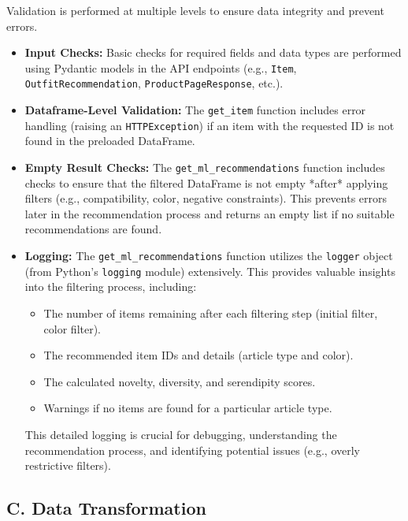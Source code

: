 \documentclass[12pt,a4paper]{article}
\begin{document}
Validation is performed at multiple levels to ensure data integrity and prevent errors.

\begin{itemize}[leftmargin=*, itemsep=0.3em]
    \item \textbf{Input Checks:}  Basic checks for required fields and data types are performed using Pydantic models in the API endpoints (e.g., \texttt{Item}, \texttt{OutfitRecommendation}, \texttt{ProductPageResponse}, etc.).

    \item \textbf{Dataframe-Level Validation:} The \texttt{get\_item} function includes error handling (raising an \texttt{HTTPException}) if an item with the requested ID is not found in the preloaded DataFrame.

    \item \textbf{Empty Result Checks:} The \texttt{get\_ml\_recommendations} function includes checks to ensure that the filtered DataFrame is not empty *after* applying filters (e.g., compatibility, color, negative constraints).  This prevents errors later in the recommendation process and returns an empty list if no suitable recommendations are found.

    \item \textbf{Logging:}  The \texttt{get\_ml\_recommendations} function utilizes the \texttt{logger} object (from Python's \texttt{logging} module) extensively.  This provides valuable insights into the filtering process, including:
      \begin{itemize}
          \item The number of items remaining after each filtering step (initial filter, color filter).
          \item The recommended item IDs and details (article type and color).
          \item The calculated novelty, diversity, and serendipity scores.
          \item Warnings if no items are found for a particular article type.
      \end{itemize}

     This detailed logging is crucial for debugging, understanding the recommendation process, and identifying potential issues (e.g., overly restrictive filters).
\end{itemize}

\subsection*{C. Data Transformation}
\end{document}
